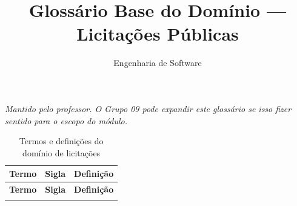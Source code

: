 \documentclass[a4paper,12pt]{article}
\title{\textbf{Glossário Base do Domínio --- Licitações Públicas}}
\author{Engenharia de Software}
\date{}
\begin{document}
\maketitle

\begin{mdframed}[linecolor=gray, backgroundcolor=gray!10]
    \small \textit{Mantido pelo professor. O Grupo 09 pode expandir este glossário se isso fizer sentido para o escopo do módulo.}
\end{mdframed}

\vspace{0.5cm}

\begin{longtable}{@{} p{4.5cm} p{1.8cm} p{8.5cm} @{}}
\caption{Termos e definições do domínio de licitações} \\
\toprule
\textbf{Termo} & \textbf{Sigla} & \textbf{Definição} \\ \midrule
\endfirsthead

\toprule
\textbf{Termo} & \textbf{Sigla} & \textbf{Definição} \\ \midrule
\endhead

\bottomrule
\endfoot


\end{longtable}
\end{document}
